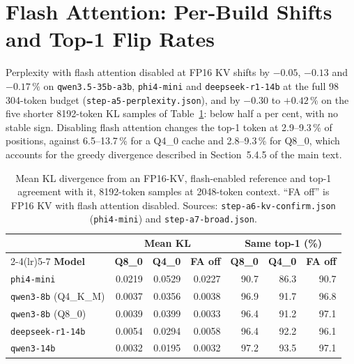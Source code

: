 \documentclass[11pt,a4paper]{article}
\begin{document}
\section{Flash Attention: Per-Build Shifts and Top-1 Flip Rates}

Perplexity with flash attention disabled at FP16 KV shifts by $-0.05$,
$-0.13$ and $-0.17\,\%$ on \texttt{qwen3.5-35b-a3b},
\texttt{phi4-mini} and \texttt{deepseek-r1-14b} at the full
98\,304-token budget (\texttt{step-a5-perplexity.json}), and by
$-0.30$ to $+0.42\,\%$ on the five shorter 8192-token KL samples of
Table~\ref{tab:s-fa}: below half a per cent, with no stable sign.
Disabling flash attention changes the top-1 token at 2.9--9.3\,\% of
positions, against 6.5--13.7\,\% for a Q4\_0 cache and 2.8--9.3\,\% for
Q8\_0, which accounts for the greedy divergence described in
Section~5.4.5 of the main text.

\begin{table}[h]
\centering\small
\caption{Mean KL divergence from an FP16-KV, flash-enabled reference
and top-1 agreement with it, 8192-token samples at 2048-token context.
``FA off'' is FP16 KV with flash attention disabled.  Sources:
\texttt{step-a6-kv-confirm.json} (\texttt{phi4-mini}) and
\texttt{step-a7-broad.json}.}
\label{tab:s-fa}
\begin{tabular}{@{}lrrrrrr@{}}
\toprule
& \multicolumn{3}{c}{\textbf{Mean KL}} & \multicolumn{3}{c}{\textbf{Same top-1 (\%)}} \\
\cmidrule(lr){2-4}\cmidrule(lr){5-7}
\textbf{Model} & \textbf{Q8\_0} & \textbf{Q4\_0} & \textbf{FA off} & \textbf{Q8\_0} & \textbf{Q4\_0} & \textbf{FA off} \\
\midrule
\texttt{phi4-mini}            & 0.0219 & 0.0529 & 0.0227 & 90.7 & 86.3 & 90.7 \\
\texttt{qwen3-8b} (Q4\_K\_M)  & 0.0037 & 0.0356 & 0.0038 & 96.9 & 91.7 & 96.8 \\
\texttt{qwen3-8b} (Q8\_0)     & 0.0039 & 0.0399 & 0.0033 & 96.4 & 91.2 & 97.1 \\
\texttt{deepseek-r1-14b}      & 0.0054 & 0.0294 & 0.0058 & 96.4 & 92.2 & 96.1 \\
\texttt{qwen3-14b}            & 0.0032 & 0.0195 & 0.0032 & 97.2 & 93.5 & 97.1 \\
\bottomrule
\end{tabular}
\end{table}
\end{document}
